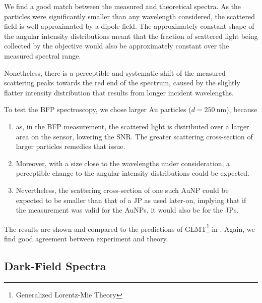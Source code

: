 \documentclass[10pt]{article}
\newcommand{\reffig}[2]{\mbox{\sffamily{Figure \ref{#1}#2}}}
\begin{document}

We find a good match between the measured and theoretical spectra. 
As the particles were significantly smaller than any wavelength considered, the scattered field is well-approximated by a dipole field. 
The approximately constant shape of the angular intensity distributions meant that the fraction of scattered light being collected by the objective would also be approximately constant over the measured spectral range.

Nonetheless, there is a perceptible and systematic shift of the measured scattering peaks towards the red end of the spectrum, caused by the slightly flatter intensity distribution that results from longer incident wavelengths.


To test the BFP spectroscopy, we chose larger Au particles ($d=\SI{250}{\nano\meter}$), because
\begin{enumerate}[label=(\alph*)]
    \item as, in the BFP measurement, the scattered light is distributed over a larger area on the sensor, lowering the SNR. The greater scattering cross-section of larger particles remedies that issue. 
    \item Moreover, with a size close to the wavelengths under consideration, a perceptible change to the angular intensity distributions could be expected. 
    \item Nevertheless, the scattering cross-section of one such AuNP could be expected to be smaller than that of a JP as used later-on, implying that if the measurement was valid for the AuNPs, it would also be for the JPs. 
\end{enumerate}

The results are shown and compared to the predictions of GLMT\footnote{Generalized Lorentz-Mie Theory}\cite{BohrenHuffman, GouesbetGrehan} in \reffig{fig:AuNP}{B}. 
Again, we find good agreement between experiment and theory. 

\subsection*{Dark-Field Spectra}
\end{document}
